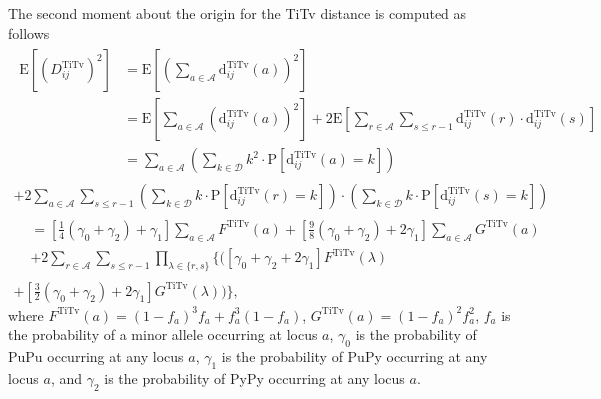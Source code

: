 \documentclass[aos]{imsart}
\begin{document}
The second moment about the origin for the TiTv distance is computed as follows
%
\begin{equation}\label{eq:mu2_DDistr_TiTv}
\begin{split}
\begin{aligned}
\text{E}\left[\left(D^\text{TiTv}_{ij}\right)^2\right] &= \text{E}\left[\left(\sum_{a \in \mathcal{A}} \text{d}^\text{TiTv}_{ij}(a)\right)^2\right] \\
&= \text{E}\left[\sum_{a \in \mathcal{A}} \left(\text{d}^\text{TiTv}_{ij}(a)\right)^2\right] + 2 \text{E}\left[\sum_{r \in \mathcal{A}} \sum_{s \leq r - 1} \text{d}^\text{TiTv}_{ij}(r) \cdot \text{d}^\text{TiTv}_{ij}(s)\right] \\
&= \sum_{a \in \mathcal{A}} \left(\sum_{k \in \mathcal{D}} k^2 \cdot \text{P}\left[\text{d}^\text{TiTv}_{ij}(a) = k\right]\right)
\end{aligned}\\
+ 2\sum_{a \in \mathcal{A}} \sum_{s \leq r - 1} \left(\sum_{k \in \mathcal{D}} k \cdot \text{P}\left[\text{d}^\text{TiTv}_{ij}(r) = k\right]\right) \cdot \left(\sum_{k \in \mathcal{D}} k \cdot \text{P}\left[\text{d}^\text{TiTv}_{ij}(s) = k\right]\right) \\
\begin{aligned}
&= \left[\frac{1}{4}(\gamma_0 + \gamma_2) + \gamma_1\right] \sum_{a \in \mathcal{A}} F^\text{TiTv}(a) + \left[\frac{9}{8}(\gamma_0 + \gamma_2) + 2\gamma_1\right] \sum_{a \in \mathcal{A}} G^\text{TiTv}(a) \\
&+ 2 \sum_{r \in \mathcal{A}} \sum_{s \leq r - 1} \prod_{\lambda \in \{r,s\}} {\Biggl\{}{\biggl(}[\gamma_0 + \gamma_2 + 2\gamma_1] F^\text{TiTv}(\lambda) 
\end{aligned}\\
+ \left[\frac{3}{2}(\gamma_0 + \gamma_2) + 2\gamma_1\right] G^\text{TiTv}(\lambda){\biggr)}{\Biggr\}},
\end{split}
\end{equation}
%
where $F^\text{TiTv}(a) = (1 - f_a)^3 f_a + f^3_a (1 - f_a)$, $G^\text{TiTv}(a) = (1 - f_a)^2 f^2_a$, $f_a$ is the probability of a minor allele occurring at locus $a$, $\gamma_0$ is the probability of PuPu occurring at any locus $a$, $\gamma_1$ is the probability of PuPy occurring at any locus $a$, and $\gamma_2$ is the probability of PyPy occurring at any locus $a$.
\end{document}
